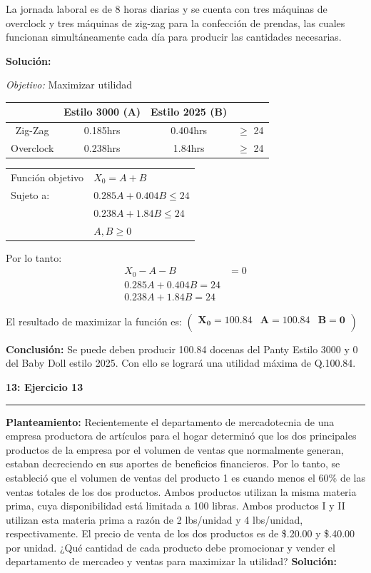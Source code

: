 \documentclass[11pt]{article}
\newcommand\problema[2]{\vspace{.01in}\textbf{#1: #2}\vspace{.5em}\hrule\vspace{.10in}}
\newcommand\planteamiento{\vspace{.10in}\textbf{Planteamiento: }}
\newcommand\solucion{\vspace{.10in}\textbf{Solución: }}
\newcommand\conclusion{\vspace{.10in}\textbf{Conclusión: }}
\newcommand\obj{\vspace{.10in}\textit{Objetivo: }}
\begin{document}
La jornada laboral es de 8 horas diarias y se cuenta con tres máquinas de overclock y tres máquinas de zig-zag para la confección de prendas, las cuales funcionan simultáneamente cada día para producir las cantidades necesarias.

\solucion

\obj Maximizar utilidad

\begin{tabular}{|c|c|c|c|}
\hline 
 & Estilo 3000 (A)  & Estilo 2025 (B) &  \\ 
\hline 
Zig-Zag & 0.185hrs & 0.404hrs & $\geq$ 24 \\ 
\hline 
Overclock & 0.238hrs & 1.84hrs & $\geq$ 24 \\ 
\hline 
\end{tabular}

\begin{table}[h]
\begin{tabular}{ll}
Función objetivo & $X_0 = A+B$    \\
Sujeto a:        & $0.285A + 0.404B \leq 24$ \\
                 & $0.238A + 1.84B \leq 24$ \\
                 & $A,B \geq 0$    
\end{tabular}
\end{table}

Por lo tanto:
\begin{align*}
X_0 - A - B &= 0\\
0.285A + 0.404B = 24\\
0.238A + 1.84B = 24
\end{align*}

El resultado de maximizar la función es:
\begin{math}
\mathbf{\left(\begin{array}{rrr}X_0=100.84&A=100.84&B=0\\\end{array}\right)}
\end{math}

\conclusion Se puede deben producir 100.84 docenas del Panty Estilo 3000 y 0 del Baby Doll estilo 2025. Con ello se logrará una utilidad máxima de Q.100.84.

\pagebreak
\problema{13}{Ejercicio 13}
\planteamiento
Recientemente el departamento de mercadotecnia de una empresa productora de artículos para el hogar determinó que los dos principales productos de la empresa por el volumen de ventas que normalmente generan, estaban decreciendo en sus aportes de beneficios financieros. Por lo tanto, se estableció que el volumen de ventas del producto 1 es cuando menos el 60\% de las ventas totales de los dos productos. Ambos productos utilizan la misma materia prima, cuya disponibilidad está limitada a 100 libras. Ambos productos I y II utilizan esta materia prima a razón de 2 lbs/unidad y 4 lbs/unidad, respectivamente. El precio de venta de los dos productos es de \$.20.00 y \$.40.00 por unidad. ¿Qué cantidad de cada producto debe promocionar y vender el departamento de mercadeo y ventas para maximizar la utilidad?
\solucion
\end{document}
